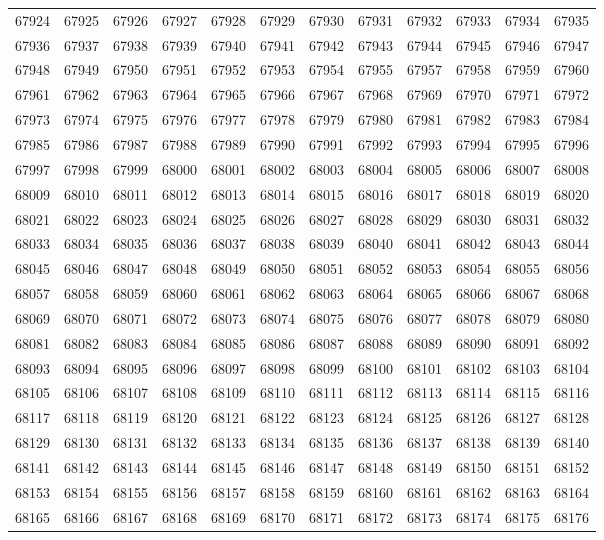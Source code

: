 \begin{center}
\begin{longtable}{llllllllllll}
67924 &67925 &67926 &67927 &67928 &67929 &67930 &67931 &67932 &67933 &67934 &67935 \\
67936 &67937 &67938 &67939 &67940 &67941 &67942 &67943 &67944 &67945 &67946 &67947 \\
67948 &67949 &67950 &67951 &67952 &67953 &67954 &67955 &67957 &67958 &67959 &67960 \\
67961 &67962 &67963 &67964 &67965 &67966 &67967 &67968 &67969 &67970 &67971 &67972 \\
67973 &67974 &67975 &67976 &67977 &67978 &67979 &67980 &67981 &67982 &67983 &67984 \\
67985 &67986 &67987 &67988 &67989 &67990 &67991 &67992 &67993 &67994 &67995 &67996 \\
67997 &67998 &67999 &68000 &68001 &68002 &68003 &68004 &68005 &68006 &68007 &68008 \\
68009 &68010 &68011 &68012 &68013 &68014 &68015 &68016 &68017 &68018 &68019 &68020 \\
68021 &68022 &68023 &68024 &68025 &68026 &68027 &68028 &68029 &68030 &68031 &68032 \\
68033 &68034 &68035 &68036 &68037 &68038 &68039 &68040 &68041 &68042 &68043 &68044 \\
68045 &68046 &68047 &68048 &68049 &68050 &68051 &68052 &68053 &68054 &68055 &68056 \\
68057 &68058 &68059 &68060 &68061 &68062 &68063 &68064 &68065 &68066 &68067 &68068 \\
68069 &68070 &68071 &68072 &68073 &68074 &68075 &68076 &68077 &68078 &68079 &68080 \\
68081 &68082 &68083 &68084 &68085 &68086 &68087 &68088 &68089 &68090 &68091 &68092 \\
68093 &68094 &68095 &68096 &68097 &68098 &68099 &68100 &68101 &68102 &68103 &68104 \\
68105 &68106 &68107 &68108 &68109 &68110 &68111 &68112 &68113 &68114 &68115 &68116 \\
68117 &68118 &68119 &68120 &68121 &68122 &68123 &68124 &68125 &68126 &68127 &68128 \\
68129 &68130 &68131 &68132 &68133 &68134 &68135 &68136 &68137 &68138 &68139 &68140 \\
68141 &68142 &68143 &68144 &68145 &68146 &68147 &68148 &68149 &68150 &68151 &68152 \\
68153 &68154 &68155 &68156 &68157 &68158 &68159 &68160 &68161 &68162 &68163 &68164 \\
68165 &68166 &68167 &68168 &68169 &68170 &68171 &68172 &68173 &68174 &68175 &68176 \\

\end{longtable}
\end{center}

